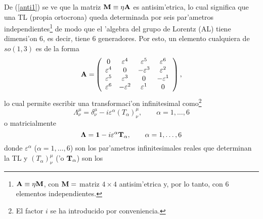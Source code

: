 De (\ref{anti1}) se ve que la matriz ${\bf M\equiv \eta A}$ es
antisim'etrica, lo cual significa que una TL (propia ortocrona) queda
determinada por seis par'ametros independientes\footnote{${\bf A\equiv
\eta M}$, con ${\bf M}=$ matriz $4\times 4$ antisim'etrica y, por lo
tanto, con 6 elementos independientes.} de modo que el 'algebra del grupo
de Lorentz (AL) tiene dimensi'on 6, es decir, tiene 6 generadores. Por esto,
un elemento cualquiera de $so(1,3)$ es de la forma 
\begin{equation}
{\bf A=}\left( 
\begin{array}{cccc}
0 & \varepsilon ^{4} & \varepsilon ^{5} & \varepsilon ^{6} \\ 
\varepsilon ^{4} & 0 & -\varepsilon ^3 & \varepsilon ^2 \\ 
\varepsilon ^{5} & \varepsilon ^3 & 0 & -\varepsilon ^1 \\ 
\varepsilon ^{6} & -\varepsilon ^2 & \varepsilon ^1 & 0
\end{array}
\right) , 
\end{equation}
lo cual permite escribir una transformaci'on infinitesimal como\footnote{%
El factor $i$ se ha introducido por conveniencia.} 
\begin{equation}
\Lambda _{\nu }^{\mu }=\delta _{\nu }^{\mu }-i\varepsilon ^{\alpha }\left(
T_{\alpha }\right) _{\nu }^{\mu },\qquad \alpha =1,\ldots ,6 
\end{equation}
o matricialmente 
\begin{equation}
{\bf \Lambda =1}-i\varepsilon ^{\alpha }{\bf T}_{\alpha },\qquad \alpha
=1,\ldots ,6 
\end{equation}
donde $\varepsilon ^{\alpha }$ ($\alpha =1,\ldots ,6$) son los
par'ametros infinitesimales reales que determinan la TL y $\left(
T_{\alpha }\right) _{\nu }^{\mu }$ ('o ${\bf T}_{\alpha }$) son los
